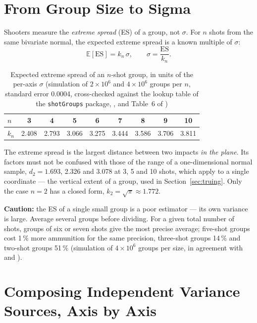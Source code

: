 \documentclass[11pt,twoside,openright]{report}
\begin{document}
\section{From Group Size to Sigma}

Shooters measure the \emph{extreme spread} (ES) of a group, not $\sigma$. For $n$ shots from the same bivariate normal, the expected extreme spread is a known multiple of $\sigma$:
\begin{equation}
  \mathbb{E}[\mathrm{ES}] = k_n\,\sigma,
  \qquad
  \sigma = \frac{\mathrm{ES}}{k_n}.
  \label{eq:es_to_sigma}
\end{equation}

\begin{table}[H]
\centering
\caption{Expected extreme spread of an $n$-shot group, in units of the per-axis $\sigma$ (simulation of $2\times10^6$ and $4\times10^6$ groups per $n$, standard error 0.0004, cross-checked against the lookup table of the \texttt{shotGroups} package, \citealp{wollschlaeger_shotgroups}, and Table~6 of \citealp{grubbs1991})}
\label{tab:es_factors}
\begin{tabular}{@{}lcccccccc@{}}
\toprule
$n$ & 3 & 4 & 5 & 6 & 7 & 8 & 9 & 10 \\
\midrule
$k_n$ & 2.408 & 2.793 & 3.066 & 3.275 & 3.444 & 3.586 & 3.706 & 3.811 \\
\bottomrule
\end{tabular}
\end{table}

The extreme spread is the largest distance between two impacts \emph{in the plane}. Its factors must not be confused with those of the range of a one-dimensional normal sample, $d_2 = 1.693$, 2.326 and 3.078 at 3, 5 and 10 shots, which apply to a single coordinate --- the vertical extent of a group, used in Section~\ref{sec:truing}. Only the case $n = 2$ has a closed form, $k_2 = \sqrt{\pi} \approx 1.772$.

\textbf{Caution:} the ES of a single small group is a poor estimator --- its own variance is large. Average several groups before dividing. For a given total number of shots, groups of six or seven shots give the most precise average; five-shot groups cost 1\,\% more ammunition for the same precision, three-shot groups 14\,\% and two-shot groups 51\,\% (simulation of $4\times10^6$ groups per size, in agreement with \citealp{ballistipedia_range} and \citealp{wollschlaeger_shotgroups}).

\section{Composing Independent Variance Sources, Axis by Axis}
\label{sec:anisotropy}
\end{document}
